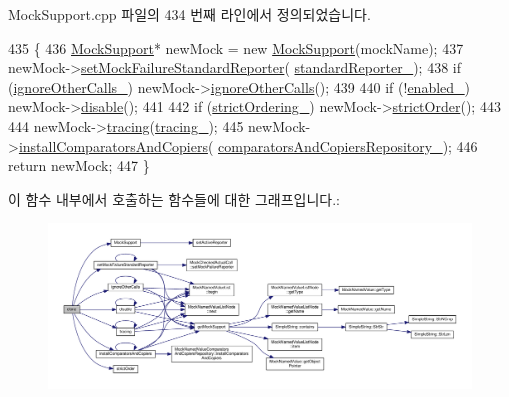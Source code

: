 Mock\+Support.\+cpp 파일의 434 번째 라인에서 정의되었습니다.


\begin{DoxyCode}
435 \{
436     \hyperlink{class_mock_support}{MockSupport}* newMock = \textcolor{keyword}{new} \hyperlink{class_mock_support_a18c663f1f5ef64aaa5bb968c5d3a731f}{MockSupport}(mockName);
437     newMock->\hyperlink{class_mock_support_a05cf05670025073bd4011757b7cdc078}{setMockFailureStandardReporter}(
      \hyperlink{class_mock_support_a6df54f7f57d625cc6c06c838e37c76c0}{standardReporter\_});
438     \textcolor{keywordflow}{if} (\hyperlink{class_mock_support_a5a3b2bc086fdd2ca5aae69b37ea70942}{ignoreOtherCalls\_}) newMock->\hyperlink{class_mock_support_ae5bfa35a3e8a4328360a1b824bfa10c6}{ignoreOtherCalls}();
439 
440     \textcolor{keywordflow}{if} (!\hyperlink{class_mock_support_ab6dfcb3e6c79f4def1295fea7f0de8c0}{enabled\_}) newMock->\hyperlink{class_mock_support_a8cfbbe53c1cf6e3054736daea3044c0f}{disable}();
441 
442     \textcolor{keywordflow}{if} (\hyperlink{class_mock_support_aeabf06d13371d5bbf5663b47374d9ebb}{strictOrdering\_}) newMock->\hyperlink{class_mock_support_ac688a6efd05134eb2868deb504e6869f}{strictOrder}();
443 
444     newMock->\hyperlink{class_mock_support_a4414204b62274c260f6507e97da7fb5e}{tracing}(\hyperlink{class_mock_support_a37e443d21e04cf8d6c14d46013cdafdb}{tracing\_});
445     newMock->\hyperlink{class_mock_support_a827874c390edb4be766153fe9e7ce6ab}{installComparatorsAndCopiers}(
      \hyperlink{class_mock_support_a372117e733b5aa30e4badf791416fd5f}{comparatorsAndCopiersRepository\_});
446     \textcolor{keywordflow}{return} newMock;
447 \}
\end{DoxyCode}


이 함수 내부에서 호출하는 함수들에 대한 그래프입니다.\+:
\nopagebreak
\begin{figure}[H]
\begin{center}
\leavevmode
\includegraphics[width=350pt]{class_mock_support_a3ba369d95973ddb4bcd6cfffd32a3c2e_cgraph}
\end{center}
\end{figure}




